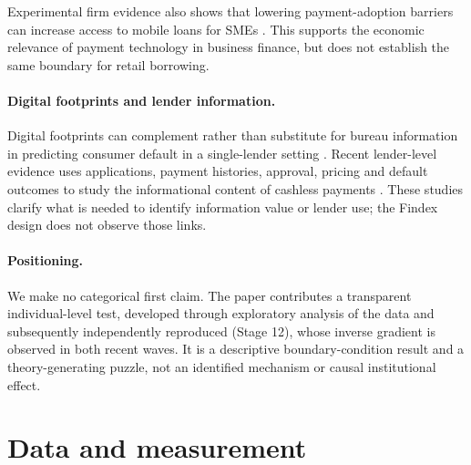 Experimental firm evidence also shows that lowering payment-adoption barriers can increase
access to mobile loans for SMEs \citep{DaltonPamukRamrattanUrasVanSoest2024}. This supports
the economic relevance of payment technology in business finance, but does not establish
the same boundary for retail borrowing.

\paragraph{Digital footprints and lender information.} Digital footprints can complement
rather than substitute for bureau information in predicting consumer default in a
single-lender setting \citep{BergBurgGombovicPuri2020}. Recent lender-level evidence uses
applications, payment histories, approval, pricing and default outcomes to study the
informational content of cashless payments \citep{Ghosh2026}. These studies clarify what
is needed to identify information value or lender use; the Findex design does not observe
those links.

\paragraph{Positioning.} We make no categorical first claim. The paper contributes a
transparent individual-level test, developed through exploratory analysis of the data and
subsequently independently reproduced (Stage 12), whose inverse gradient is observed in
both recent waves. It is a descriptive boundary-condition result and a theory-generating
puzzle, not an identified mechanism or causal institutional effect.

\section{Data and measurement}

